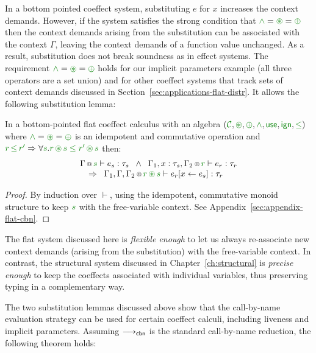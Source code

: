 In a bottom pointed coeffect system, substituting $e$ for $x$ increases the context
demands. However, if the system satisfies the strong condition that $\czip = \cseq = \cpar$
then the context demands arising from the substitution can be associated with the context
$\Gamma$, leaving the context demands of a function value unchanged. As a result, substitution
does not break soundness as in effect systems. The requirement $\czip = \cseq = \cpar$ holds for
our implicit parameters example (all three operators are a set union) and for other coeffect
systems that track sets of context demands discussed in Section~\ref{sec:applications-flat-distr}.
It allows the following substitution lemma:

\begin{lemma}
\label{thm:cbn-substitution-bot}
In a bottom-pointed flat coeffect calculus with an algebra $(\C, \cseq, \cpar, \czip, \cunit, \czero, \cleq)$
where $\czip = \cseq = \cpar$ is an idempotent and commutative operation and
$\cclrd{r}\,\cleq\,\cclrd{r'} \Rightarrow \forall\cclrd{s}.\cclrd{r}\,\cseq\,\cclrd{s}\;\cleq\;\cclrd{r'}\,\cseq\,\cclrd{s}$ then:
%
\begin{equation*}
\begin{array}{l}
\coctx{\Gamma}{\cclrd{s}} \vdash e_s : \tau_s \;\; \wedge \;\;
\coctx{\Gamma_1,  x : \tau_s, \Gamma_2}{ \cclrd{r}  } \vdash e_r : \tau_r\\
\quad \Rightarrow \;\; \coctx{\Gamma_1,\Gamma,\Gamma_2}{ \cclrd{r} \,\cseq\, \cclrd{s} } \vdash \subst{e_r}{x}{e_s} : \tau_r
\end{array}
\end{equation*}

\end{lemma}
\begin{proof}
By induction over $\vdash$, using the idempotent, commutative monoid structure to keep $\cclrd{s}$ with
the free-variable context. See Appendix~\ref{sec:appendix-flat-cbn}.
\end{proof}

\noindent
The flat system discussed here is \emph{flexible enough} to let us always re-associate new context
demands (arising from the substitution) with the free-vari\-able context. In contrast, the
structural system discussed in Chapter~\ref{ch:structural} is \emph{precise enough} to keep the
coeffects associated with individual variables, thus preserving typing in a complementary way.

The two substitution lemmas discussed above show that the call-by-name evaluation strategy can be
used for certain coeffect calculi, including liveness and implicit parameters. Assuming
$\longrightarrow_{\textnormal{\sffamily cbn}}$ is the standard call-by-name reduction, the following theorem holds:

